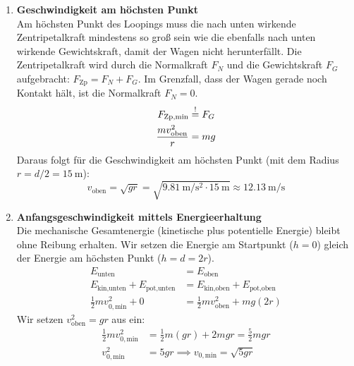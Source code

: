 \documentclass[ngerman]{scrreprt}
\newenvironment{loesungbox}[1]
  {\needspace{5\baselineskip}\begin{loesungboxstyle}[frametitle={#1}]}
  {\end{loesungboxstyle}}
\begin{document}
\begin{loesungbox}{Lösung zu \Cref{aufg:looping_geschwindigkeit}}
\begin{enumerate}
    \item \textbf{Geschwindigkeit am höchsten Punkt} \\
    Am höchsten Punkt des Loopings muss die nach unten wirkende Zentripetalkraft mindestens so groß sein wie die ebenfalls nach unten wirkende Gewichtskraft, damit der Wagen nicht herunterfällt. Die Zentripetalkraft wird durch die Normalkraft $F_N$ und die Gewichtskraft $F_G$ aufgebracht: $F_{\text{Zp}} = F_N + F_G$. Im Grenzfall, dass der Wagen gerade noch Kontakt hält, ist die Normalkraft $F_N=0$.
    \begin{align}\label{eq: looping_kraftansatz}
        F_{\text{Zp,min}} & \stackrel{!}{=} F_G  \nonumber \\
        \frac{m v_{\text{oben}}^2}{r} &= m g
    \end{align}
    Daraus folgt für die Geschwindigkeit am höchsten Punkt (mit dem Radius $r = d/2 = \SI{15}{\m}$):
    \begin{equation}\label{eq: v_oben_looping}
        v_{\text{oben}} = \sqrt{gr} = \sqrt{\SI{9.81}{\meter\per\second\squared} \cdot \SI{15}{\meter}} \approx \SI{12.13}{\meter\per\second}
    \end{equation}

    \item \textbf{Anfangsgeschwindigkeit mittels Energieerhaltung} \\
    Die mechanische Gesamtenergie (kinetische plus potentielle Energie) bleibt ohne Reibung erhalten. Wir setzen die Energie am Startpunkt ($h=0$) gleich der Energie am höchsten Punkt ($h=d=2r$).
    \begin{align}\label{eq: energieerhaltung_looping}
        E_{\text{unten}} &= E_{\text{oben}} \nonumber \\
        E_{\text{kin,unten}} + E_{\text{pot,unten}} &= E_{\text{kin,oben}} + E_{\text{pot,oben}} \nonumber \\
        \frac{1}{2}m v_{0,\text{min}}^2 + 0 &= \frac{1}{2}m v_{\text{oben}}^2 + mg(2r)
    \end{align}
    Wir setzen $v_{\text{oben}}^2 = gr$ aus  ein:
    \begin{align}
        \frac{1}{2}m v_{0,\text{min}}^2 &= \frac{1}{2}m(gr) + 2mgr = \frac{5}{2}mgr \nonumber \\
        v_{0,\text{min}}^2 &= 5gr \implies v_{0,\text{min}} = \sqrt{5gr}
    \end{align}


\end{enumerate}
\end{loesungbox}
\end{document}
